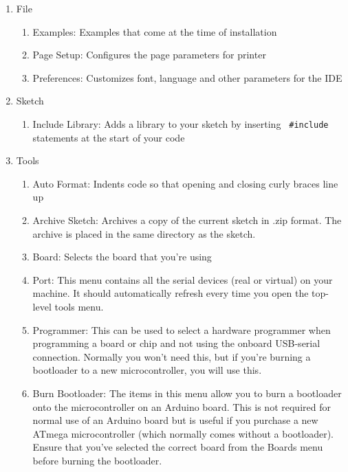 \begin{enumerate}
      \item File
            \begin{enumerate}
                  \item Examples: Examples that come at the time of installation
                  \item Page Setup: Configures the page parameters for printer
                  \item Preferences: Customizes font, language and other parameters for
                        the IDE
            \end{enumerate}
      \item Sketch
            \begin{enumerate}
                  \item Include Library: Adds a library to your sketch by inserting {\tt
                                    \#include} statements at the start of your code
            \end{enumerate}
      \item Tools
            \begin{enumerate}
                  \item Auto Format: Indents code so that opening and closing curly
                        braces line up
                  \item Archive Sketch: Archives a copy of the current sketch in .zip
                        format. The archive is placed in the same directory as the sketch.
                  \item Board: Selects the board that you're using
                  \item Port: This menu contains all the serial devices (real or
                        virtual) on your machine. It should automatically refresh every time
                        you open the top-level tools menu.
                  \item Programmer: This can be used to select a hardware programmer when programming a board or chip and not using the onboard USB-serial
                        connection. Normally you won't need this, but if you're burning a
                        bootloader to a new microcontroller, you will use this.
                  \item Burn Bootloader: The items in this menu allow you to burn a
                        bootloader onto the microcontroller on an Arduino board. This is not
                        required for normal use of an Arduino board but is useful if you
                        purchase a new ATmega microcontroller (which normally comes without a
                        bootloader). Ensure that you've selected the correct board from the
                        Boards menu before burning the bootloader.
            \end{enumerate}
\end{enumerate}

